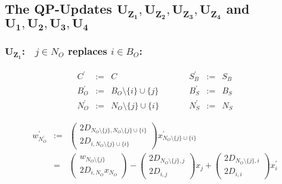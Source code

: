 \documentclass[a4paper]{article}
\begin{document}
\subsection{The QP-Updates $\mathbf{U_{Z_{1}}}, \mathbf{U_{Z_{2}}},
  \mathbf{U_{Z_{3}}}, \mathbf{U_{Z_{4}}}$ and $\mathbf{U_{1}}, \mathbf{U_{2}},
  \mathbf{U_{3}}, \mathbf{U_{4}}$}

\subsubsection{$\mathbf{U_{Z_{1}}}$:$\quad j \in N_{O}$ replaces $i \in B_{O}$:}
\begin{equation}
\label{update:o_z_rep_o}
\begin{array}{ccccccc}
C^{\prime}      &:=&  C
&\quad\quad&
S_{B}^{\prime}  &:=&  S_{B}  \\
B_{O}^{\prime}  &:=&  B_{O} \setminus \{i\} \cup \{j\}
&\quad\quad&
B_{S}^{\prime}  &:=&  B_{S} \\
N_{O}^{\prime}  &:=&  N_{O} \setminus\{j\} \cup \{i\}
&\quad\quad&
N_{S}^{\prime}  &:=&  N_{S}
\end{array}
\end{equation}

\begin{eqnarray}
w_{N_{O}^{\prime}}^{\prime}
&:=&
\left(
\begin{array}{c}
2D_{N_{O} \setminus\{j\}, N_{O} \setminus\{j\} \cup \{i\}} \\
\hline
2D_{i, N_{O} \setminus\{j\} \cup \{i\}}
\end{array}
\right)
x_{N_{O} \setminus\{j\} \cup \{i\}}^{\prime}
\nonumber \\
&=&
\left(
\begin{array}{c}
w_{N_{O} \setminus\{j\}} \\
\hline
2D_{i, N_{O}}x_{N_{O}}
\end{array}
\right)
-
\left(
\begin{array}{c}
2D_{N_{O} \setminus\{j\}, j} \\
\hline
2D_{i, j}
\end{array}
\right)
x_{j}
+
\left(
\begin{array}{c}
2D_{N_{O} \setminus\{j\}, i} \\
\hline
2D_{i, i}
\end{array}
\right)
x_{i}^{\prime}
\end{eqnarray}
\end{document}
